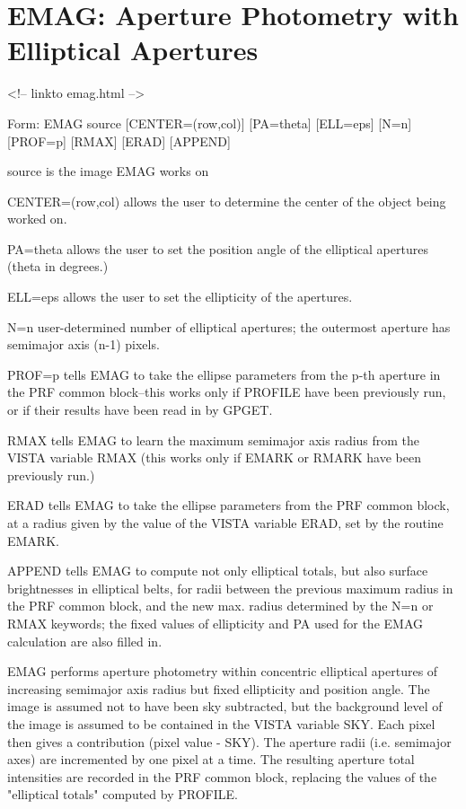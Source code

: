 \section{EMAG: Aperture Photometry with Elliptical Apertures}
\begin{rawhtml}
<!-- linkto emag.html -->
\end{rawhtml}
\begin{command}
  \item[Form: EMAG source {[CENTER=(row,col)]} {[PA=theta]} {[ELL=eps]} {[N=n]}
     {[PROF=p]} {[RMAX]} {[ERAD]} {[APPEND]}\hfill]{}
  \item[source]{is the image EMAG works on}
  \item[CENTER=(row,col)]{allows the user to determine the center
       of the object being worked on.}
  \item[PA=theta]{allows the user to set the position angle of
       the elliptical apertures (theta in degrees.)}
  \item[ELL=eps]{allows the user to set the ellipticity of the
       apertures.}
  \item[N=n]{user-determined number of elliptical apertures;
       the outermost aperture has semimajor axis (n-1) pixels.}
  \item[PROF=p]{tells EMAG to take the ellipse parameters from the p-th
       aperture in the PRF common block--this works only if PROFILE have
       been previously run, or if their results have been read in by
       GPGET.}
  \item[RMAX]{tells EMAG to learn the maximum semimajor axis radius from
       the VISTA variable RMAX (this works only if EMARK or RMARK have been
       previously run.)}
  \item[ERAD]{tells EMAG to take the ellipse parameters from the PRF common
       block, at a radius given by the value of the VISTA variable ERAD,
       set by the routine EMARK.}
  \item[APPEND]{tells EMAG to compute not only elliptical totals, but also
       surface brightnesses in elliptical belts, for radii between the
       previous maximum radius in the PRF common block, and the new
       max. radius determined by the N=n or RMAX keywords; the fixed values
       of ellipticity and PA used for the EMAG calculation are also filled
       in.}
\end{command}

EMAG performs aperture photometry within concentric elliptical apertures of
increasing semimajor axis radius but fixed ellipticity and position angle.
The image is assumed not to have been sky subtracted, but the background
level of the image is assumed to be contained in the VISTA variable
SKY. Each pixel then gives a contribution (pixel value - SKY).  The
aperture radii (i.e. semimajor axes) are incremented by one pixel at a
time. The resulting aperture total intensities are recorded in the PRF
common block, replacing the values of the "elliptical totals" computed by
PROFILE.

